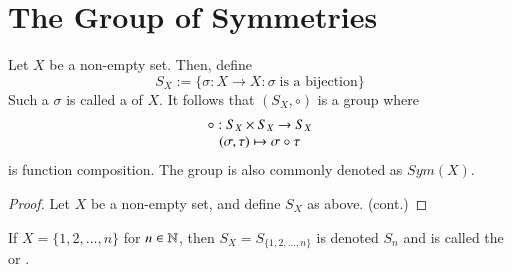 \documentclass[12pt, a4paper, oneside, openright, titlepage]{book}
\begin{document}
\section{\textsection The Group of Symmetries}

\begin{defn}
    Let $X$ be a non-empty set. Then, define \begin{equation}
        S_X:=\{\sigma:X\rightarrow X:\sigma\;\text{is a bijection}\}
    \end{equation}
    Such a $\sigma$ is called a  of $X$. It follows that $(S_X, \circ)$ is a group where \begin{equation}
        \begin{array}{c} \circ:S_X\times S_X\rightarrow S_X \\ (\sigma,\tau)\mapsto \sigma \circ \tau \end{array}
    \end{equation}
    is function composition. The group is also commonly denoted as $Sym(X)$.
    \begin{proof}
        Let $X$ be a non-empty set, and define $S_X$ as above. (cont.)
    \end{proof}
\end{defn}

\begin{defn}
    If $X = \{1,2,...,n\}$ for $n \in \mathbb N$, then $S_X = S_{\{1,2,...,n\}}$ is denoted $S_n$ and is called the  or .
\end{defn}
\end{document}
